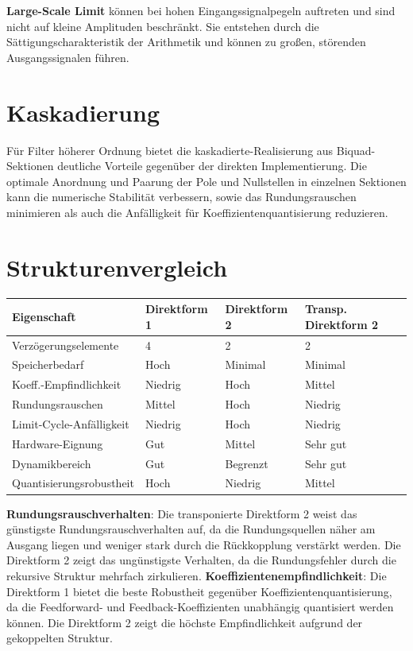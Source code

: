 \documentclass[
  ngerman,
  letterpaper,
  DIV=11]{scrreprt}
\begin{document}
\textbf{Large-Scale Limit} können bei hohen Eingangssignalpegeln
auftreten und sind nicht auf kleine Amplituden beschränkt. Sie entstehen
durch die Sättigungscharakteristik der Arithmetik und können zu großen,
störenden Ausgangssignalen führen.

\section{Kaskadierung}\label{kaskadierung}

Für Filter höherer Ordnung bietet die kaskadierte-Realisierung aus
Biquad-Sektionen deutliche Vorteile gegenüber der direkten
Implementierung. Die optimale Anordnung und Paarung der Pole und
Nullstellen in einzelnen Sektionen kann die numerische Stabilität
verbessern, sowie das Rundungsrauschen minimieren als auch die
Anfälligkeit für Koeffizientenquantisierung reduzieren.

\section{Strukturenvergleich}\label{strukturenvergleich}

\begin{longtable}[]{@{}llll@{}}
\toprule\noalign{}
Eigenschaft & Direktform 1 & Direktform 2 & Transp. Direktform 2 \\
\midrule\noalign{}
\endhead
\bottomrule\noalign{}
\endlastfoot
Verzögerungselemente & 4 & 2 & 2 \\
Speicherbedarf & Hoch & Minimal & Minimal \\
Koeff.-Empfindlichkeit & Niedrig & Hoch & Mittel \\
Rundungsrauschen & Mittel & Hoch & Niedrig \\
Limit-Cycle-Anfälligkeit & Niedrig & Hoch & Niedrig \\
Hardware-Eignung & Gut & Mittel & Sehr gut \\
Dynamikbereich & Gut & Begrenzt & Sehr gut \\
Quantisierungsrobustheit & Hoch & Niedrig & Mittel \\
\end{longtable}

\textbf{Rundungsrauschverhalten}: Die transponierte Direktform 2 weist
das günstigste Rundungsrauschverhalten auf, da die Rundungsquellen näher
am Ausgang liegen und weniger stark durch die Rückkopplung verstärkt
werden. Die Direktform 2 zeigt das ungünstigste Verhalten, da die
Rundungsfehler durch die rekursive Struktur mehrfach zirkulieren.
\textbf{Koeffizientenempfindlichkeit}: Die Direktform 1 bietet die beste
Robustheit gegenüber Koeffizientenquantisierung, da die Feedforward- und
Feedback-Koeffizienten unabhängig quantisiert werden können. Die
Direktform 2 zeigt die höchste Empfindlichkeit aufgrund der gekoppelten
Struktur.
\end{document}
